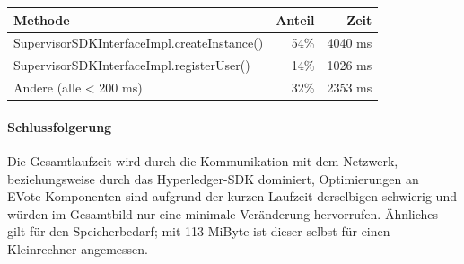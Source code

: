 \documentclass[parskip=full]{scrartcl}
\begin{document}
\begin{table}[h!]
	\begin{tabular}[t]{lrr}
		Methode & Anteil & Zeit \\ \hline
		SupervisorSDKInterfaceImpl.createInstance() & 54\% & 4040 ms \\
		SupervisorSDKInterfaceImpl.registerUser() & 14\% & 1026 ms \\
		Andere (alle < 200 ms) & 32\% & 2353 ms
	\end{tabular}
\end{table}
%
%

\paragraph{Schlussfolgerung}
Die Gesamtlaufzeit wird durch die Kommunikation mit dem Netzwerk, beziehungsweise durch das Hyperledger-SDK dominiert, Optimierungen an EVote-Komponenten sind aufgrund der kurzen Laufzeit derselbigen schwierig und würden im Gesamtbild nur eine minimale Veränderung hervorrufen. Ähnliches gilt für den Speicherbedarf; mit 113 MiByte ist dieser selbst für einen Kleinrechner angemessen.
\end{document}
